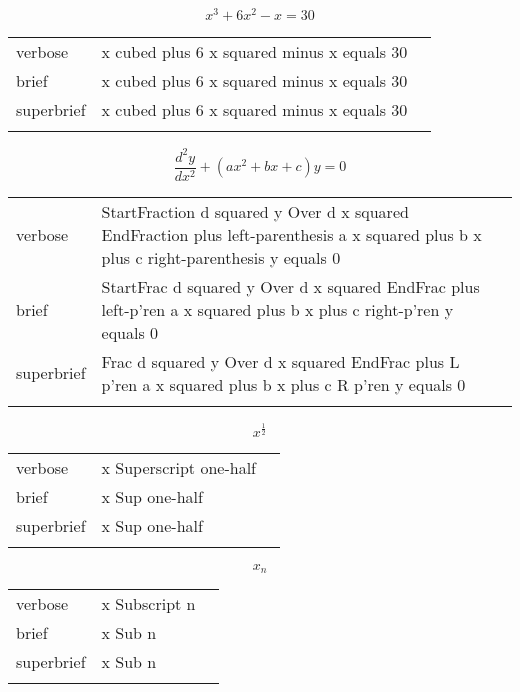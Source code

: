
\label{sec:super}

\R
\E \[x^3+6x^2-x=30\]
\begin{longtable}[c]{@{}lll@{}}
\toprule\addlinespace
verbose & x cubed plus 6 x squared minus x equals 30 &

\\\addlinespace
brief & x cubed plus 6 x squared minus x equals 30 &

\\\addlinespace
superbrief & x cubed plus 6 x squared minus x equals 30 &

\\\addlinespace
\bottomrule
\end{longtable}


\E \[\frac{d^2y}{dx^2} + \left(ax^2+bx+c\right) y = 0\]
\begin{longtable}[c]{@{}lll@{}}
\toprule\addlinespace
verbose & StartFraction d squared y Over d x squared EndFraction plus
left-parenthesis a x squared plus b x plus c right-parenthesis y equals
0 &

\\\addlinespace
brief & StartFrac d squared y Over d x squared EndFrac plus left-p'ren a
x squared plus b x plus c right-p'ren y equals 0 &

\\\addlinespace
superbrief & Frac d squared y Over d x squared EndFrac plus L p'ren a x
squared plus b x plus c R p'ren y equals 0 &

\\\addlinespace
\bottomrule
\end{longtable}


\R
\E \[x^{\frac{1}{2}}\]
\begin{longtable}[c]{@{}lll@{}}
\toprule\addlinespace
verbose & x Superscript one-half &

\\\addlinespace
brief & x Sup one-half &

\\\addlinespace
superbrief & x Sup one-half &

\\\addlinespace
\bottomrule
\end{longtable}


\E \[x_n\]
\begin{longtable}[c]{@{}lll@{}}
\toprule\addlinespace
verbose & x Subscript n &

\\\addlinespace
brief & x Sub n &

\\\addlinespace
superbrief & x Sub n &

\\\addlinespace
\bottomrule
\end{longtable}


